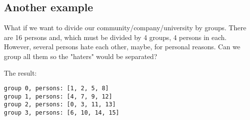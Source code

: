 \subsection{Another example}

What if we want to divide our community/company/university by groups.
There are 16 persons and, which must be divided by 4 groups, 4 persons in each.
However, several persons hate each other, maybe, for personal reasons.
Can we group all them so the "haters" would be separated?



The result:

\begin{lstlisting}
group 0, persons: [1, 2, 5, 8]
group 1, persons: [4, 7, 9, 12]
group 2, persons: [0, 3, 11, 13]
group 3, persons: [6, 10, 14, 15]
\end{lstlisting}

